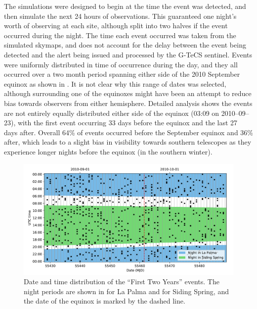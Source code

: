 \begin{colsection}
\begin{colsection}
The simulations were designed to begin at the time the event was detected, and then simulate the next 24 hours of observations. This guaranteed one night's worth of observing at each site, although split into two halves if the event occurred during the night. The time each event occurred was taken from the simulated skymaps, and does not account for the delay between the event being detected and the alert being issued and processed by the G-TeCS sentinel. Events were uniformly distributed in time of occurrence during the day, and they all occurred over a two month period spanning either side of the 2010 September equinox as shown in . It is not clear why this range of dates was selected, although surrounding one of the equinoxes might have been an attempt to reduce bias towards observers from either hemisphere. Detailed analysis shows the events are not entirely equally distributed either side of the equinox (03:09 on 2010--09--23), with the first event occurring 33 days before the equinox and the last 27 days after. Overall 64\% of events occurred before the September equinox and 36\% after, which leads to a slight bias in visibility towards southern telescopes as they experience longer nights before the equinox (in the southern winter).

\begin{figure}[t]
    \begin{center}
        \includegraphics[width=\linewidth]{images/f2y_times.pdf}
    \end{center}
    \caption[Date and time distribution of events in the First Two Years sample]{
        Date and time distribution of the ``First Two Years'' events. The night periods are shown in  for La Palma and  for Siding Spring, and the date of the equinox is marked by the  dashed line.
    }\label{fig:f2y_times}
\end{figure}


\end{colsection}
\end{colsection}
